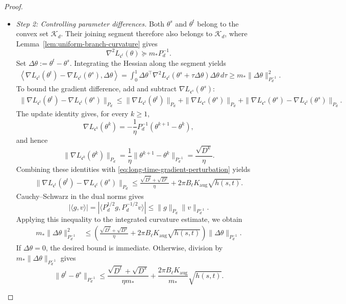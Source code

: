 \begin{proof}
\begin{itemize}[wide]
\item \emph{Step 2: Controlling parameter differences.}
Both $\theta^s$ and $\theta^t$ belong to the convex set
$\mathcal K_d$. Their joining segment therefore also belongs
to $\mathcal K_d$, where
Lemma~\ref{lem:uniform-branch-curvature} gives
\[
    \nabla^2L_{\mathfrak c^t}(\theta)
    \succeq m_*P_d^{-1}.
\]
Set $\Delta\theta:=\theta^t-\theta^s$.
Integrating the Hessian along the segment yields
\[
\begin{aligned}
    \left\langle
        \nabla L_{\mathfrak c^t}(\theta^t)
        -\nabla L_{\mathfrak c^t}(\theta^s),
        \Delta\theta
    \right\rangle
    =
    \int_0^1
        \Delta\theta^\top
        \nabla^2L_{\mathfrak c^t}
            (\theta^s+\tau\Delta\theta)
        \Delta\theta\,d\tau
    \geq
    m_*\|\Delta\theta\|_{P_d^{-1}}^2.
\end{aligned}
\]
To bound the gradient difference, add and subtract
$\nabla L_{\mathfrak c^s}(\theta^s)$:
\[
\begin{aligned}
    \|\nabla L_{\mathfrak c^t}(\theta^t)
          -\nabla L_{\mathfrak c^t}(\theta^s)\|_{P_d}
    \leq
    \|\nabla L_{\mathfrak c^t}(\theta^t)\|_{P_d}
    +\|\nabla L_{\mathfrak c^s}(\theta^s)\|_{P_d}
    +
    \|\nabla L_{\mathfrak c^s}(\theta^s)
          -\nabla L_{\mathfrak c^t}(\theta^s)\|_{P_d}.
\end{aligned}
\]
The update identity gives, for every $k\geq1$,
\[
    \nabla L_{\mathfrak c^k}(\theta^k)
    =
    -\frac1\eta P_d^{-1}(\theta^{k+1}-\theta^k),
\]
and hence
\[
    \|\nabla L_{\mathfrak c^k}(\theta^k)\|_{P_d}
    =
    \frac1\eta
    \|\theta^{k+1}-\theta^k\|_{P_d^{-1}}
    =
    \frac{\sqrt{D^k}}{\eta}.
\]
Combining these identities with
\eqref{eq:long-time-gradient-perturbation} yields
\[
\begin{aligned}
    \|\nabla L_{\mathfrak c^t}(\theta^t)
          -\nabla L_{\mathfrak c^t}(\theta^s)\|_{P_d}
    \leq
    \frac{\sqrt{D^t}+\sqrt{D^s}}{\eta}
    +2\pi B_\ell K_{\mathrm{aug}}\sqrt{h(s,t)}.
\end{aligned}
\]
Cauchy--Schwarz in the dual norms gives
\[
    |\langle g,v\rangle|
    =
    |\langle P_d^{1/2}g,P_d^{-1/2}v\rangle|
    \leq\|g\|_{P_d}\|v\|_{P_d^{-1}}.
\]
Applying this inequality to the integrated curvature estimate,
we obtain
\[
\begin{aligned}
    m_*\|\Delta\theta\|_{P_d^{-1}}^2
    &\leq
    \left(
        \frac{\sqrt{D^t}+\sqrt{D^s}}{\eta}
        +2\pi B_\ell K_{\mathrm{aug}}\sqrt{h(s,t)}
    \right)
    \|\Delta\theta\|_{P_d^{-1}}.
\end{aligned}
\]
If $\Delta\theta=0$, the desired bound is immediate.
Otherwise, division by
$m_*\|\Delta\theta\|_{P_d^{-1}}$ gives
\begin{equation}
    \|\theta^t-\theta^s\|_{P_d^{-1}}
    \leq
    \frac{\sqrt{D^t}+\sqrt{D^s}}{\eta m_*}
    +\frac{2\pi B_\ell K_{\mathrm{aug}}}{m_*}
        \sqrt{h(s,t)}.
    \label{eq:long-time-finite-two-time-stability}
\end{equation}


\end{itemize}
\end{proof}
